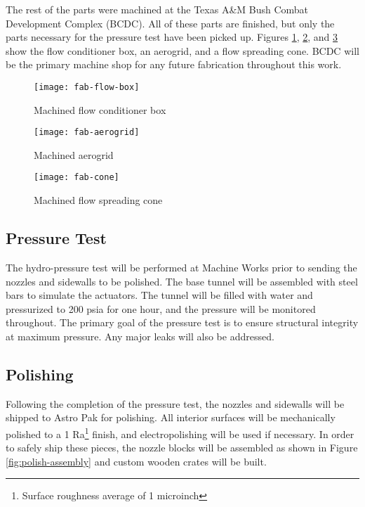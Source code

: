 The rest of the parts were machined at the Texas A\&M Bush Combat Development Complex (BCDC). All of these parts are finished, but only the parts necessary for the pressure test have been picked up. Figures \ref{fig:fab-flow-box}, \ref{fig:fab-aerogrid}, and \ref{fig:fab-cone} show the flow conditioner box, an aerogrid, and a flow spreading cone. BCDC will be the primary machine shop for any future fabrication throughout this work.

\begin{figure}[ht!]
    \centering
    \texttt{[image: fab-flow-box]}
    \caption{Machined flow conditioner box}
    \label{fig:fab-flow-box}
\end{figure}

\begin{figure}[ht!]
    \centering
    \texttt{[image: fab-aerogrid]}
    \caption{Machined aerogrid}
    \label{fig:fab-aerogrid}
\end{figure}

\begin{figure}[ht!]
    \centering
    \texttt{[image: fab-cone]}
    \caption{Machined flow spreading cone}
    \label{fig:fab-cone}
\end{figure}

\clearpage

\subsection{Pressure Test}

The hydro-pressure test will be performed at Machine Works prior to sending the nozzles and sidewalls to be polished. The base tunnel will be assembled with steel bars to simulate the actuators. The tunnel will be filled with water and pressurized to 200 psia for one hour, and the pressure will be monitored throughout. The primary goal of the pressure test is to ensure structural integrity at maximum pressure. Any major leaks will also be addressed.

\subsection{Polishing}

Following the completion of the pressure test, the nozzles and sidewalls will be shipped to Astro Pak for polishing. All interior surfaces will be mechanically polished to a 1 Ra\footnote{Surface roughness average of 1 microinch} finish, and electropolishing will be used if necessary. In order to safely ship these pieces, the nozzle blocks will be assembled as shown in Figure \ref{fig:polish-assembly} and custom wooden crates will be built.

